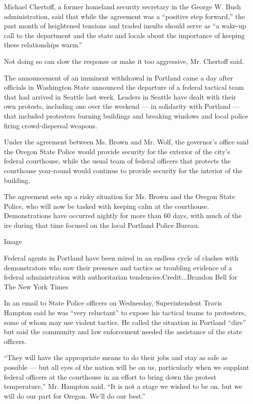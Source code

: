 Michael Chertoff, a former homeland security secretary in the George W.
Bush administration, said that while the agreement was a ``positive step
forward,'' the past month of heightened tensions and traded insults
should serve as ``a wake-up call to the department and the state and
locals about the importance of keeping these relationships warm.''

Not doing so can slow the response or make it too aggressive, Mr.
Chertoff said.

The announcement of an imminent withdrawal in Portland came a day after
officials in Washington State announced the departure of a federal
tactical team that had arrived in Seattle last week. Leaders in Seattle
have dealt with their own protests, including one over the weekend ---
in solidarity with Portland --- that included protesters burning
buildings and breaking windows and local police firing crowd-dispersal
weapons.

Under the agreement between Ms. Brown and Mr. Wolf, the governor's
office said the Oregon State Police would provide security for the
exterior of the city's federal courthouse, while the usual team of
federal officers that protects the courthouse year-round would continue
to provide security for the interior of the building.

The agreement sets up a risky situation for Ms. Brown and the Oregon
State Police, who will now be tasked with keeping calm at the
courthouse. Demonstrations have occurred nightly for more than 60 days,
with much of the ire during that time focused on the local Portland
Police Bureau.

Image

Federal agents in Portland have been mired in an endless cycle of
clashes with demonstrators who saw their presence and tactics as
troubling evidence of a federal administration with authoritarian
tendencies.Credit...Brandon Bell for The New York Times

In an email to State Police officers on Wednesday, Superintendent Travis
Hampton said he was ``very reluctant'' to expose his tactical teams to
protesters, some of whom may use violent tactics. He called the
situation in Portland ``dire'' but said the community and law
enforcement needed the assistance of the state officers.

``They will have the appropriate means to do their jobs and stay as safe
as possible --- but all eyes of the nation will be on us, particularly
when we supplant federal officers at the courthouse in an effort to
bring down the protest temperature,'' Mr. Hampton said. ``It is not a
stage we wished to be on, but we will do our part for Oregon. We'll do
our best.''


